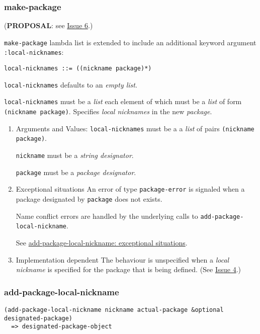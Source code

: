 \documentclass[11pt]{article}
\begin{document}
\subsubsection{make-package}
\label{sec:org21b99a6}
(\textbf{PROPOSAL}: see \hyperref[sec:org6a4ca43]{Issue 6}.)

\texttt{make-package} lambda list is extended to include an additional keyword argument
\texttt{:local-nicknames}:
\begin{verbatim}
local-nicknames ::= ((nickname package)*)
\end{verbatim}


\texttt{local-nicknames} defaults to an \emph{empty list}.

\texttt{local-nicknames} must be a \emph{list} each element of which must be a \emph{list} of form
\texttt{(nickname package)}. Specifies \emph{local nicknames} in the new \emph{package}.
\begin{enumerate}
\item Arguments and Values:
\label{sec:org44a6526}
\texttt{local-nicknames} must be a a \emph{list} of pairs \texttt{(nickname package)}.

\texttt{nickname} must be a \emph{string designator}.

\texttt{package} must be a \emph{package designator}.
\item Exceptional situations
\label{sec:org1340c10}
An error of type \texttt{package-error} is signaled when a package designated by
\texttt{package} does not exists.

Name conflict errors are handled by the underlying calls to
\texttt{add-package-local-nickname}.

See \hyperref[sec:org638abe8]{add-package-local-nickname: exceptional situations}.
\item Implementation dependent
\label{sec:org344a692}
The behaviour is unspecified when a \emph{local nickname} is specified for the package
that is being defined. (See \hyperref[sec:org6067ecf]{Issue 4}.)
\end{enumerate}
\subsubsection{add-package-local-nickname}
\label{sec:org18d7ada}
\begin{verbatim}
(add-package-local-nickname nickname actual-package &optional designated-package)
  => designated-package-object
\end{verbatim}
\end{document}
